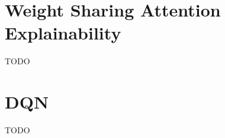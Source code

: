 \section{Weight Sharing Attention Explainability}\label{sec:explainability}
TODO





\section{DQN}\label{sec:dqn}
TODO




\\
\\




